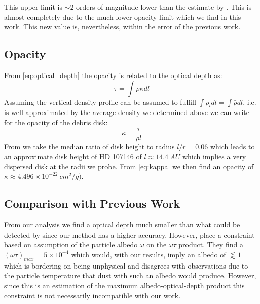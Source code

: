 \documentclass{aa}
\begin{document}
This upper limit is $\sim 2$ orders of magnitude lower than the estimate by \cite{vanSluijs2018feasibility}. This is almost completely due to the much lower opacity limit which we find in this work. This new value is, nevertheless, within the error of the previous work.


\subsection{Opacity}
\label{sec:dis_opacity}

From \autoref{eq:optical_depth} the opacity is related to the optical depth as:
\begin{equation}
    \tau=\int \rho \kappa d l
\end{equation}
Assuming the vertical density profile can be assumed to fulfill $\int \rho_{l} dl = \int \bar{\rho} dl $, i.e. is well approximated by the average density we determined above we can write for the opacity of the debris disk:
\begin{equation}
    \label{eq:kappa}
    \kappa  = \frac{\tau}{\rho  l}
\end{equation}
From \cite{hughes2018debris} we take the median ratio of disk height to radius $l/r=0.06$ which leads to an approximate disk height of HD 107146 of $l \approx 14.4 ~AU$ which implies a very dispersed disk at the radii we probe. From \autoref{eq:kappa} we then find an opacity of $\kappa \approx 4.496\times10^{-22} ~cm^2/g)$. %


\subsection{Comparison with Previous Work}
\label{sec:dis_Previous_research}

From our analysis we find a optical depth much smaller than what could be detected by \citep{vanSluijs2018feasibility} since our method has a higher accuracy. However, \citep{schneider2016extinction} place a constraint based on assumption of the particle albedo $\omega$ on the $\omega \tau$ product. They find a $(\omega \tau)_{max} = 5\times10^{-4}$ which would, with our results, imply an albedo of $\lessapprox 1$ which is bordering on being unphysical and disagrees with observations due to the particle temperature that dust with such an albedo would produce. However, since this is an estimation of the maximum albedo-optical-depth product this constraint is not necessarily incompatible with our work.\\
\end{document}
